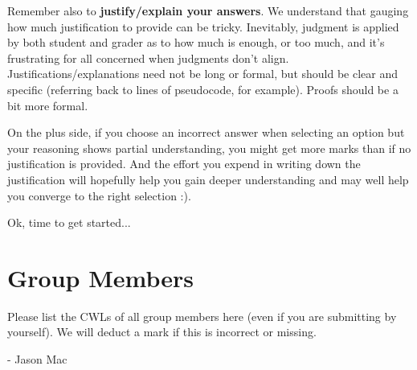 \documentclass[11pt,fleqn]{exam}
\newif\ifsolutions\solutionsfalse
\begin{document}
Remember also  to \textbf{justify/explain  your answers}. We  understand that  gauging how
much  justification to  provide can  be tricky.  Inevitably, judgment  is applied  by both
student and  grader as to how  much is enough, or  too much, and it's  frustrating for all
concerned  when judgments  don't align.  Justifications/explanations need  not be  long or
formal, but  should be  clear and  specific (referring  back to  lines of  pseudocode, for
example). Proofs should be a bit more formal.

On the  plus side, if  you choose an  incorrect answer when  selecting an option  but your
reasoning shows partial  understanding, you might get more marks  than if no justification
is provided. And  the effort you expend  in writing down the  justification will hopefully
help you gain deeper  understanding and may well help you converge  to the right selection
:).

\vspace{.1in}

Ok, time to get started...

\clearpage

\section*{Group Members}

Please list the CWLs of all group members here (even if you are submitting by yourself). We will deduct a mark if this is incorrect or missing.

- Jason Mac


\ifsolutions\else\newpage\fi







\ifsolutions\else\newpage\fi


\ifsolutions\else\newpage\fi


\ifsolutions\else\newpage\fi
\end{document}

